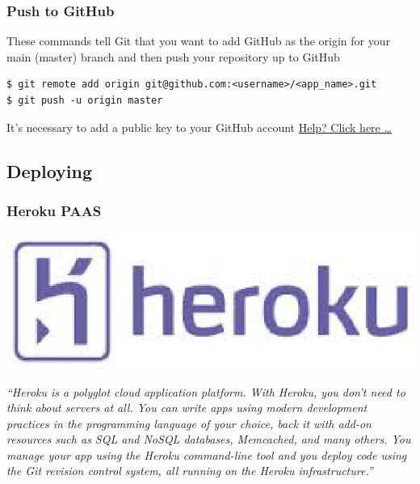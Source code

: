 \documentclass{beamer}
\begin{document}
\begin{frame}[fragile]
\frametitle{Push to GitHub}
These commands tell Git that you want to add GitHub as the origin for your main (master) branch and then push your repository up to GitHub
\lstset{language=shell}
\begin{lstlisting}[escapechar=!]
$ git remote add origin git@github.com:<username>/<app_name>.git
$ git push -u origin master
\end{lstlisting}
It's necessary to add a public key to your GitHub account \href{https://help.github.com/articles/generating-ssh-keys}{\alert{Help? Click here \dots}}
\end{frame}
\subsection{Deploying}
\begin{frame}[fragile]
\frametitle{Heroku PAAS}
\includegraphics[width = 0.25 \textwidth]{heroku.eps} 

\emph{``Heroku is a polyglot cloud application platform. With Heroku, you don’t need to think about servers at all. You can write apps using modern development practices in the programming language of your choice, back it with add-on resources such as SQL and NoSQL databases, Memcached, and many others. You manage your app using the Heroku command-line tool and you deploy code using the Git revision control system, all running on the Heroku infrastructure.''}
\end{frame}
\end{document}
